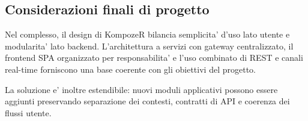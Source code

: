 \subsection{Considerazioni finali di progetto}

Nel complesso, il design di KompozeR bilancia semplicita' d'uso lato utente e modularita' lato backend. 
L'architettura a servizi con gateway centralizzato, il frontend SPA organizzato per responsabilita' e l'uso combinato di REST e canali real-time forniscono una base coerente con gli obiettivi del progetto.

La soluzione e' inoltre estendibile: nuovi moduli applicativi possono essere aggiunti preservando separazione dei contesti, contratti di API e coerenza dei flussi utente.

\newpage